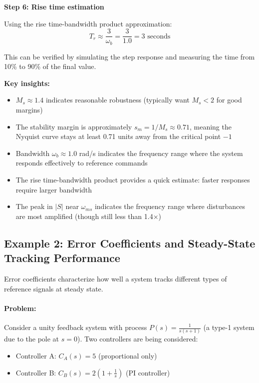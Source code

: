 \documentclass[11pt,a4paper]{article}
\begin{document}
\textbf{Step 6: Rise time estimation}

Using the rise time-bandwidth product approximation:
\begin{equation}
	T_r \approx \frac{3}{\omega_b} = \frac{3}{1.0} = 3 \text{ seconds}
\end{equation}

This can be verified by simulating the step response and measuring the time from 10\% to 90\% of the final value.

\textbf{Key insights:}
\begin{itemize}
\item $M_s \approx 1.4$ indicates reasonable robustness (typically want $M_s < 2$ for good margins)
\item The stability margin is approximately $s_m = 1/M_s \approx 0.71$, meaning the Nyquist curve stays at least 0.71 units away from the critical point $-1$
\item Bandwidth $\omega_b \approx 1.0$ rad/s indicates the frequency range where the system responds effectively to reference commands
\item The rise time-bandwidth product provides a quick estimate: faster responses require larger bandwidth
\item The peak in $|S|$ near $\omega_{ms}$ indicates the frequency range where disturbances are most amplified (though still less than 1.4×)
\end{itemize}

\subsection{Example 2: Error Coefficients and Steady-State Tracking Performance}

Error coefficients characterize how well a system tracks different types of reference signals at steady state.

\paragraph{Problem:}
Consider a unity feedback system with process $P(s) = \frac{1}{s(s+1)}$ (a type-1 system due to the pole at $s=0$). Two controllers are being considered:
\begin{itemize}
\item Controller A: $C_A(s) = 5$ (proportional only)
\item Controller B: $C_B(s) = 2(1 + \frac{1}{s})$ (PI controller)
\end{itemize}
\end{document}
